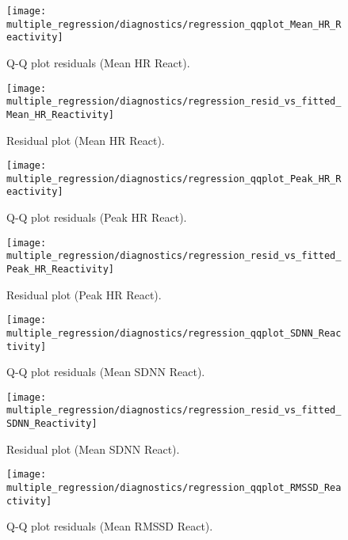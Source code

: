 \documentclass[11pt, a4paper]{report}
\begin{document}
\begin{figure}[H]
    \centering
    \begin{minipage}{0.48\textwidth}
        \texttt{[image: multiple\_regression/diagnostics/regression\_qqplot\_Mean\_HR\_Reactivity]}
        \caption{Q-Q plot residuals (Mean HR React).}
        \label{fig:qq_meanhr_results}
    \end{minipage}\hfill
    \begin{minipage}{0.48\textwidth}
        \texttt{[image: multiple\_regression/diagnostics/regression\_resid\_vs\_fitted\_Mean\_HR\_Reactivity]}
        \caption{Residual plot (Mean HR React).}
        \label{fig:resid_meanhr_results}
    \end{minipage}
    \vspace{\floatsep}
    \begin{minipage}{0.48\textwidth}
        \texttt{[image: multiple\_regression/diagnostics/regression\_qqplot\_Peak\_HR\_Reactivity]}
        \caption{Q-Q plot residuals (Peak HR React).}
         \label{fig:qq_peakhr_results}
    \end{minipage}\hfill
    \begin{minipage}{0.48\textwidth}
        \texttt{[image: multiple\_regression/diagnostics/regression\_resid\_vs\_fitted\_Peak\_HR\_Reactivity]}
        \caption{Residual plot (Peak HR React).}
         \label{fig:resid_peakhr_results}
    \end{minipage}
        \vspace{\floatsep}
    \begin{minipage}{0.48\textwidth}
        \texttt{[image: multiple\_regression/diagnostics/regression\_qqplot\_SDNN\_Reactivity]}
        \caption{Q-Q plot residuals (Mean SDNN React).}
        \label{fig:qq_sdnn_results}
    \end{minipage}\hfill
    \begin{minipage}{0.48\textwidth}
        \texttt{[image: multiple\_regression/diagnostics/regression\_resid\_vs\_fitted\_SDNN\_Reactivity]}
        \caption{Residual plot (Mean SDNN React).}
        \label{fig:resid_sdnn_results}
    \end{minipage}
        \vspace{\floatsep}
    \begin{minipage}{0.48\textwidth}
        \texttt{[image: multiple\_regression/diagnostics/regression\_qqplot\_RMSSD\_Reactivity]}
        \caption{Q-Q plot residuals (Mean RMSSD React).}

\end{minipage}
\end{figure}
\end{document}
